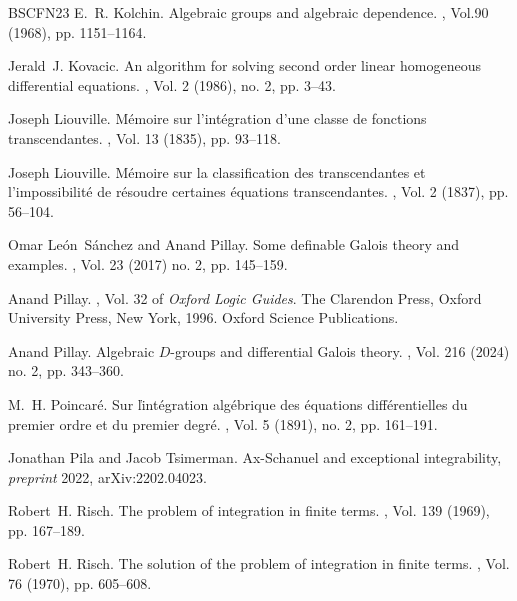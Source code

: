 \documentclass[12pt]{amsart}
\theoremstyle{definition}
\theoremstyle{plain}
\theoremstyle{exampstyle}\newtheorem{thmx}{Theorem}
\theoremstyle{exampstyle}\newtheorem{thmxbis}{Theorem}
\begin{document}
\begin{thebibliography}{BSCFN23}
E.~R. Kolchin.
\newblock Algebraic groups and algebraic dependence.
, Vol.90 (1968), pp. 1151--1164.

Jerald~J. Kovacic.
\newblock An algorithm for solving second order linear homogeneous differential
  equations.
, Vol. 2 (1986), no. 2, pp. 3--43.

Joseph Liouville.
\newblock M\'{e}moire sur l'int\'{e}gration d'une classe de fonctions
  transcendantes.
, Vol. 13 (1835), pp. 93--118.

Joseph Liouville.
\newblock Mémoire sur la classification des transcendantes et l'impossibilité
  de résoudre certaines équations transcendantes.
, Vol. 2 (1837), pp. 56--104.

Omar Le\'{o}n~S\'{a}nchez and Anand Pillay.
\newblock Some definable {G}alois theory and examples.
, Vol. 23 (2017) no. 2, pp. 145--159.

Anand Pillay.
, Vol. 32 of {\em Oxford Logic
  Guides}.
\newblock The Clarendon Press, Oxford University Press, New York, 1996.
\newblock Oxford Science Publications.

Anand Pillay.
\newblock Algebraic {$D$}-groups and differential {G}alois theory.
, Vol. 216 (2024) no. 2, pp. 343--360.

M.~H. Poincar{\'e}.
\newblock Sur {\v l}int{\'e}gration alg{\'e}brique des {\'e}quations
  diff{\'e}rentielles du premier ordre et du premier degr{\'e}.
,
  Vol. 5 (1891), no. 2, pp. 161--191.

Jonathan Pila and Jacob Tsimerman.
\newblock Ax-{S}chanuel and exceptional integrability, {\em preprint} 2022, arXiv:2202.04023.

Robert~H. Risch.
\newblock The problem of integration in finite terms.
, Vol. 139 (1969), pp. 167--189.

Robert~H. Risch.
\newblock The solution of the problem of integration in finite terms.
, Vol. 76 (1970), pp. 605--608.


\end{thebibliography}
\end{document}
